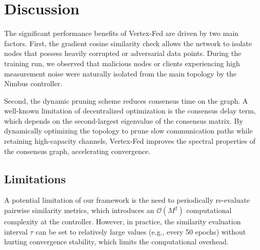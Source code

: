 \section{Discussion}
\label{sec:disc}
The significant performance benefits of Vertex-Fed are driven by two main factors. First, the gradient cosine similarity check allows the network to isolate nodes that possess heavily corrupted or adversarial data points. During the training run, we observed that malicious nodes or clients experiencing high measurement noise were naturally isolated from the main topology by the Nimbus controller.

Second, the dynamic pruning scheme reduces consensus time on the graph. A well-known limitation of decentralized optimization is the consensus delay term, which depends on the second-largest eigenvalue of the consensus matrix. By dynamically optimizing the topology to prune slow communication paths while retaining high-capacity channels, Vertex-Fed improves the spectral properties of the consensus graph, accelerating convergence.

\subsection{Limitations}
A potential limitation of our framework is the need to periodically re-evaluate pairwise similarity metrics, which introduces an $\mathcal{O}(M^2)$ computational complexity at the controller. However, in practice, the similarity evaluation interval $\tau$ can be set to relatively large values (e.g., every 50 epochs) without hurting convergence stability, which limits the computational overhead.

